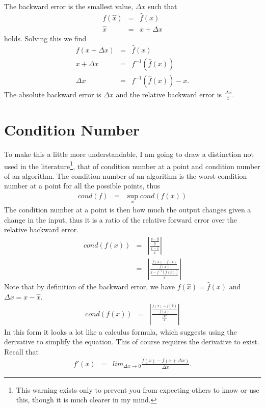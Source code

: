 The backward error is the smallest value, $\Delta x$ such that
\begin{eqnarray}
f(\hat x) &=& \hat f(x)\\
\hat x &=& x+\Delta x
\end{eqnarray}
holds.  Solving this we find
\begin{eqnarray*}
f(x+\Delta x) &=& \hat f(x)\\
x+\Delta x &=& f^{-1}\left(\hat f(x)\right)\\
\Delta x &=& f^{-1}\left(\hat f(x)\right)-x.
\end{eqnarray*}
The absolute backward error is $\Delta x$ and the relative backward error is $\frac{\Delta x}{x}$.

\section{Condition Number}
To make this a little more understandable, I am going to draw a distinction not used in the literature\footnote{This warning exists only to prevent you from expecting others to know or use this, though it is much clearer in my mind.}, that of condition number at a point and condition number of an algorithm.  The condition number of an algorithm is the worst condition number at a point for all the possible points, thus
\begin{eqnarray}
cond(f) &=& \sup_x cond(f(x))
\end{eqnarray}
The condition number at a point is then how much the output changes given a change in the input, thus it is a ratio of the relative forward error over the relative backward error.
\begin{eqnarray*}
cond(f(x)) &=& \left|\frac{\frac{y-\hat y}{y}}{\frac{x-\hat x}{x}}\right| \\
           &=& \left|\frac{\frac{f(x)-\hat f(x)}{f(x)}}{\frac{x-f^{-1}(\hat f(x))}{x}}\right|
\end{eqnarray*}
Note that by definition of the backward error, we have $f(\hat x) = \hat f(x)$ and $\Delta x= x-\hat x$.
\begin{eqnarray*}
cond(f(x)) &=& \left|\frac{\frac{f(x)-f(\hat x)}{f(x)}}{\frac{\Delta x}{x}}\right|
\end{eqnarray*}
In this form it looks a lot like a calculus formula, which suggests using the derivative to simplify the equation.  This of course requires the derivative to exist.  Recall that 
\begin{eqnarray*}
f'(x)&=&lim_{\Delta x\rightarrow 0}\frac{f(x)-f(x+\Delta x)}{\Delta x}.
\end{eqnarray*}
